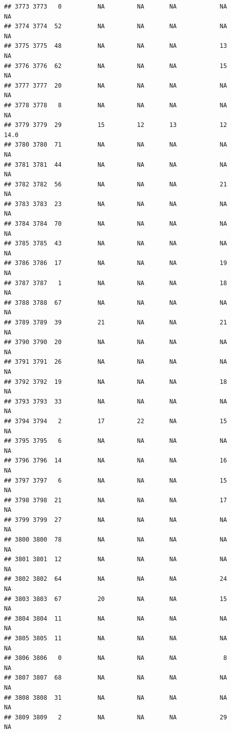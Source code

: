 \documentclass[man]{apa6}
\begin{document}
\begin{verbatim}
## 3773 3773   0          NA         NA       NA            NA       NA
## 3774 3774  52          NA         NA       NA            NA       NA
## 3775 3775  48          NA         NA       NA            13       NA
## 3776 3776  62          NA         NA       NA            15       NA
## 3777 3777  20          NA         NA       NA            NA       NA
## 3778 3778   8          NA         NA       NA            NA       NA
## 3779 3779  29          15         12       13            12     14.0
## 3780 3780  71          NA         NA       NA            NA       NA
## 3781 3781  44          NA         NA       NA            NA       NA
## 3782 3782  56          NA         NA       NA            21       NA
## 3783 3783  23          NA         NA       NA            NA       NA
## 3784 3784  70          NA         NA       NA            NA       NA
## 3785 3785  43          NA         NA       NA            NA       NA
## 3786 3786  17          NA         NA       NA            19       NA
## 3787 3787   1          NA         NA       NA            18       NA
## 3788 3788  67          NA         NA       NA            NA       NA
## 3789 3789  39          21         NA       NA            21       NA
## 3790 3790  20          NA         NA       NA            NA       NA
## 3791 3791  26          NA         NA       NA            NA       NA
## 3792 3792  19          NA         NA       NA            18       NA
## 3793 3793  33          NA         NA       NA            NA       NA
## 3794 3794   2          17         22       NA            15       NA
## 3795 3795   6          NA         NA       NA            NA       NA
## 3796 3796  14          NA         NA       NA            16       NA
## 3797 3797   6          NA         NA       NA            15       NA
## 3798 3798  21          NA         NA       NA            17       NA
## 3799 3799  27          NA         NA       NA            NA       NA
## 3800 3800  78          NA         NA       NA            NA       NA
## 3801 3801  12          NA         NA       NA            NA       NA
## 3802 3802  64          NA         NA       NA            24       NA
## 3803 3803  67          20         NA       NA            15       NA
## 3804 3804  11          NA         NA       NA            NA       NA
## 3805 3805  11          NA         NA       NA            NA       NA
## 3806 3806   0          NA         NA       NA             8       NA
## 3807 3807  68          NA         NA       NA            NA       NA
## 3808 3808  31          NA         NA       NA            NA       NA
## 3809 3809   2          NA         NA       NA            29       NA

\end{verbatim}
\end{document}
